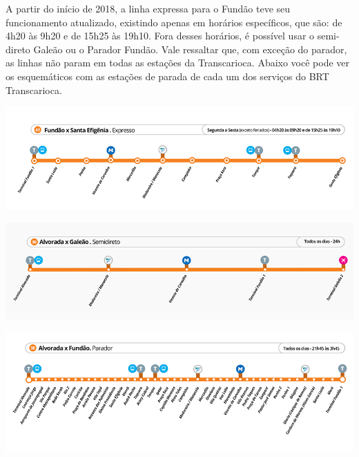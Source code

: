         A partir do início de 2018, a linha expressa para o Fundão teve seu funcionamento atualizado, existindo apenas em horários específicos, que são: de 4h20 às 9h20 e de 15h25 às 19h10. Fora desses horários, é possível usar o semi-direto Galeão ou o Parador Fundão. Vale ressaltar que, com exceção do parador, as linhas não param em todas as estações da Transcarioca. Abaixo você pode ver os esquemáticos com as estações de parada de cada um dos serviços do BRT Transcarioca.
        \begin{center}
        	\includegraphics[width=\textwidth]{assets/mapa__transcarioca_expresso.png}
        \end{center}
        \begin{center}
        	\includegraphics[width=\textwidth]{assets/mapa_transcarioca_semidireto.png}
        \end{center}    
        \begin{center}
        	\includegraphics[width=\textwidth]{assets/mapa_transcarioca_parador2.png}
        \end{center}
